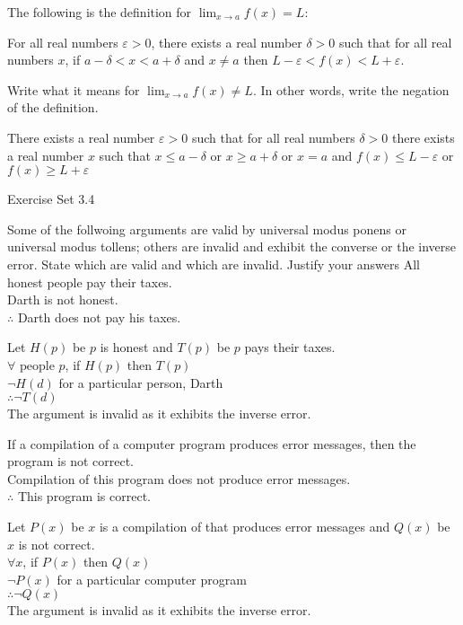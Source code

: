 \documentclass[12pt,letterpaper, onecolumn]{exam}
\begin{document}
\begin{questions}
		\setcounter{question}{42}\question The following is the definition for  $\lim_{x\to a} f(x) = L$: 
		\begin{center}
			For all real numbers $\varepsilon >0$, there exists a real number $\delta>0$ such that for all real numbers $x$, if $a-\delta < x < a+\delta$ and $x\neq a$ then $L-\varepsilon < f(x) < L+\varepsilon$.
		\end{center}
		Write what it means for  $\lim_{x\to a} f(x) \neq L$. In other words, write the negation of the definition.
		\begin{solution}
			There exists a real number $\varepsilon>0$ such that for all real numbers $\delta >0$ there exists a real number $x$ such that $x\leq a-\delta$ or $x\geq a+\delta$ or $x=a$ and $f(x)\leq L-\varepsilon$ or $f(x)\geq L+\varepsilon$
		\end{solution}
		\begin{center}
			Exercise Set 3.4
		\end{center}
		Some of the follwoing arguments are valid by universal modus ponens or universal modus tollens; others are invalid and exhibit the converse or the inverse error. State which are valid and which are invalid. Justify your answers
		\setcounter{question}{11}\question All honest people pay their taxes. \\
		Darth is not honest.\\
		$\therefore$ Darth does not pay his taxes.
		\begin{solution}
			Let $H(p)$ be $p$ is honest and $T(p)$ be $p$ pays their taxes.\\
			$\forall \textrm{ people } p$, if $H(p)$ then $T(p)$\\
			$\neg H(d)$ for a particular person, Darth\\
			$\therefore \neg T(d)$\\
			The argument is invalid as it exhibits the inverse error.
		\end{solution}
		
		\setcounter{question}{13}\question If a compilation of a computer program produces error messages, then the program is not correct. \\
		Compilation of this program does not produce error messages.\\
		$\therefore$ This program is correct.
		\begin{solution}
			Let $P(x)$ be $x$ is a compilation of that produces error messages and $Q(x)$ be $x$ is not correct.\\
			$\forall x$, if $P(x)$ then $Q(x)$\\
			$\neg P(x)$ for a particular computer program\\
			$\therefore \neg Q(x)$\\
			The argument is invalid as it exhibits the inverse error.
		\end{solution}
		

\end{questions}
\end{document}
